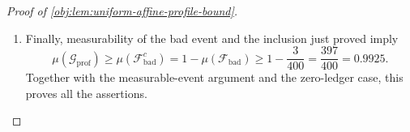 \begin{proof}[Proof of \cref{obj:lem:uniform-affine-profile-bound}]
\begin{enumerate}
\[\]
Here \(|c|^2\le1/4\). Since both ledger terms are nonnegative,
\[
\begin{aligned}
|W(c)-\|\theta_P(c)\|_2^2|
&\le
120\sqrt{\Lambda_{n,v}}\,\|\theta_P(c)\|_2
+
90\sqrt M\,\Lambda_{n,v}\\
&\le
128\left(
\sqrt{\Lambda_{n,v}}\,\|\theta_P(c)\|_2
+
\sqrt M\,\Lambda_{n,v}
\right).
\end{aligned}
\]
The sample was fixed throughout and \(c\) was arbitrary in the profiling interval. Thus
\[
\mathcal F_{\mathrm{bad}}^c\subseteq\mathcal G_{\mathrm{prof}}.
\]

\item
Finally, measurability of the bad event and the inclusion just proved imply
\[
\mu(\mathcal G_{\mathrm{prof}})
\ge
\mu(\mathcal F_{\mathrm{bad}}^c)
=
1-\mu(\mathcal F_{\mathrm{bad}})
\ge
1-\frac3{400}
=
\frac{397}{400}
=
0.9925.
\]
Together with the measurable-event argument and the zero-ledger case, this proves all the assertions.
\end{enumerate}
\end{proof}
